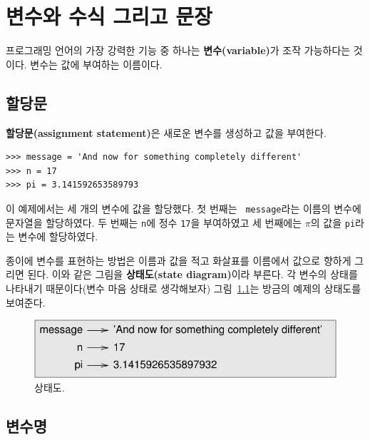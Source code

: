 \documentclass[10pt]{book}
\begin{document}
\chapter{변수와 수식 그리고 문장}


프로그래밍 언어의 가장 강력한 기능 중 하나는 {\bf 변수(variable)}가
조작 가능하다는 것이다.  변수는 값에 부여하는 이름이다.


\section{할당문}
\label{variables}

{\bf 할당문(assignment statement)}은 새로운 변수를 생성하고 값을 부여한다. 

\begin{verbatim}
>>> message = 'And now for something completely different'
>>> n = 17
>>> pi = 3.141592653589793
\end{verbatim}
%
이 예제에서는 세 개의 변수에 값을 할당했다.  첫 번째는 {\tt
  message}라는 이름의 변수에 문자열을 할당하였다.  두 번째는 {\tt n}에
정수 {\tt 17}을 부여하였고 세 번째에는 $\pi$의 값을 {\tt pi}라는 변수에
할당하였다.

종이에 변수를 표현하는 방법은 이름과 값을 적고 화살표를 이름에서 값으로
향하게 그리면 된다. 이와 같은 그림을 {\bf 상태도(state diagram)}이라
부른다.  각 변수의 상태를 나타내기 때문이다(변수 마음 상태로
생각해보자)
그림~\ref{fig.state2}는 방금의 예제의 상태도를 보여준다. 


\begin{figure}
\centerline
{\includegraphics[scale=0.8]{figs/state2.pdf}}
\caption{상태도.}
\label{fig.state2}
\end{figure}



\section{변수명}
\end{document}
